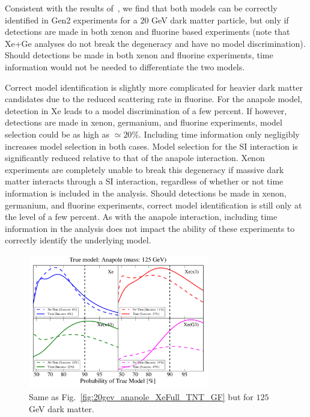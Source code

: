 \documentclass[11pt]{article}
\begin{document}
Consistent with the results of~\cite{Gluscevic:2015sqa}, we find that both models can be correctly identified in Gen2 experiments for a $20$ GeV dark matter particle, but only if detections are made in both xenon and fluorine based experiments (note that Xe+Ge analyses do not break the degeneracy and have no model discrimination). Should detections be made in both xenon and fluorine experiments, time information would not be needed to differentiate the two models.  



Correct model identification is slightly more complicated for heavier dark matter candidates due to the reduced scattering rate in fluorine. For the anapole model, detection in Xe leads to a model discrimination of a few percent. If however, detections are made in xenon, germanium, and fluorine experiments, model selection could be as high as $\simeq 20 \%$. Including time information only negligibly increases model selection in both cases. Model selection for the SI interaction is significantly reduced relative to that of the anapole interaction. Xenon experiments are completely unable to break this degeneracy if massive dark matter interacts through a SI interaction, regardless of whether or not time information is included in the analysis. Should detections be made in xenon, germanium, and fluorine experiments, correct model identification is still only at the level of a few percent. As with the anapole interaction, including time information in the analysis does not impact the ability of these experiments to correctly identify the underlying model. 

\begin{figure}
\centering
\includegraphics[width=0.7\textwidth]{plots/PDF_125GeV_Anapole_50sims_Xe_Xe3x_Xe10x_XeG3_GF_TNT.pdf}
\caption{\label{fig:125gev_anapole_XeFull_TNT_GF}
Same as Fig.~\ref{fig:20gev_anapole_XeFull_TNT_GF} but for $125$ GeV dark matter.}
\end{figure}
\end{document}
